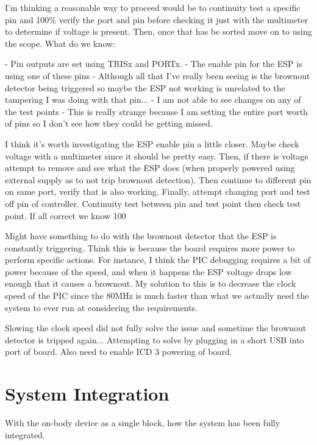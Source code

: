 I'm thinking a reasonable way to proceed would be to continuity test
a specific pin and 100\% verify the port and pin before checking it just
with the multimeter to determine if voltage is present. Then, once that
has be sorted move on to using the scope.
What do we know:

    - Pin outputs are set using TRISx and PORTx.
    - The enable pin for the ESP is using one of these pins
        - Although all that I've really been seeing
        is the brownout detector being triggered
        so maybe the ESP not working is unrelated to the
        tampering I was doing with that pin...
    - I am not able to see changes on any of the test points
        - This is really strange because I am setting the entire port
        worth of pins so I don't see how they could be getting missed.

I think it's worth investigating the ESP enable pin a little closer.
Maybe check voltage with a multimeter since it should be pretty easy.
Then, if there is voltage attempt to remove and see what the ESP does
(when properly powered using external supply as to not trip
brownout detection).
Then continue to different pin on same port, verify that is also working.
Finally, attempt changing port and test off pin of controller.
Continuity test between pin and test point then check test point.
If all correct we know 100%

Might have something to do with the brownout detector that the ESP is constantly triggering.
Think this is because the board requires more power to perform specific actions.
For instance, I think the PIC debugging requires a bit of power because of the speed,
and when it happens the ESP voltage drops low enough that it causes a brownout.
My solution to this is to decrease the clock speed of the PIC since the 80MHz is much
faster than what we actually need the system to ever run at considering the requirements.

Slowing the clock speed did not fully solve the issue and sometime the brownout detector
is tripped again...
Attempting to solve by plugging in a short USB into port of board.
Also need to enable ICD 3 powering of board.

\section{System Integration}
With the on-body device as a single block, how the system has been fully integrated.

